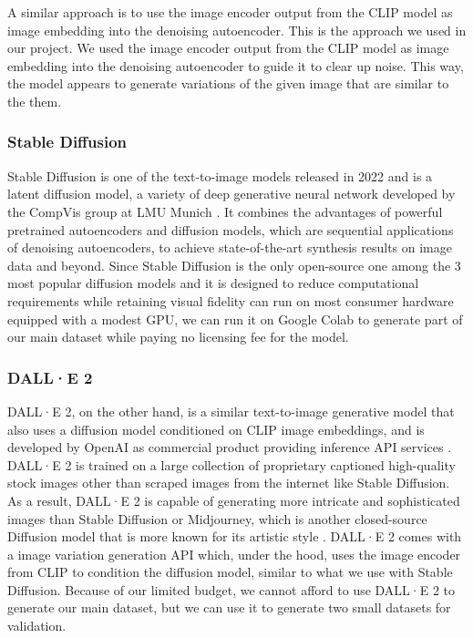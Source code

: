 \documentclass[11pt]{article}
\begin{document}
A similar approach is to use the image encoder output from the CLIP model as image embedding into the denoising autoencoder. This is the approach we used in our project. We used the image encoder output from the CLIP model as image embedding into the denoising autoencoder to guide it to clear up noise. This way, the model appears to generate variations of the given image that are similar to the them.

\subsubsection{Stable Diffusion}

Stable Diffusion is one of the text-to-image models released in 2022 and is a latent diffusion model, a variety of deep generative neural network developed by the CompVis group at LMU Munich \cite{rombach2022high}. It combines the advantages of powerful pretrained autoencoders and diffusion models, which are sequential applications of denoising autoencoders, to achieve state-of-the-art synthesis results on image data and beyond. Since Stable Diffusion is the only open-source one among the 3 most popular diffusion models and it is designed to reduce computational requirements while retaining visual fidelity can run on most consumer hardware equipped with a modest GPU, we can run it on Google Colab to generate part of our main dataset while paying no licensing fee for the model.

\subsubsection{DALL·E 2}

DALL·E 2, on the other hand, is a similar text-to-image generative model that also uses a diffusion model conditioned on CLIP image embeddings, and is developed by OpenAI as commercial product providing inference API services \cite{ramesh2022hierarchical}. DALL·E 2 is trained on a large collection of proprietary captioned high-quality stock images other than scraped images from the internet like Stable Diffusion. As a result, DALL·E 2 is capable of generating more intricate and sophisticated images than Stable Diffusion or Midjourney, which is another closed-source Diffusion model that is more known for its artistic style \cite{oppenlaender2022creativity}. DALL·E 2 comes with a image variation generation API which, under the hood, uses the image encoder from CLIP to condition the diffusion model, similar to what we use with Stable Diffusion. Because of our limited budget, we cannot afford to use DALL·E 2 to generate our main dataset, but we can use it to generate two small datasets for validation.
\end{document}
